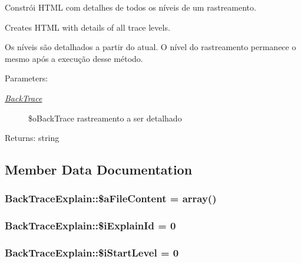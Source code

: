 Constrói HTML com detalhes de todos os níveis de um rastreamento.

Creates HTML with details of all trace levels.

Os níveis são detalhados a partir do atual. O nível do rastreamento permanece o mesmo após a execução desse método.

\begin{Desc}
\item[Parameters:]
\begin{description}
\item[{\em \hyperlink{class_back_trace}{BackTrace}}]\$oBackTrace rastreamento a ser detalhado \end{description}
\end{Desc}
\begin{Desc}
\item[Returns:]string \end{Desc}


\subsection{Member Data Documentation}
\hypertarget{class_back_trace_explain_bc66a959dd0c9dd7fa44b770beeccfbc}{
\subsubsection[{\$aFileContent}]{\setlength{\rightskip}{0pt plus 5cm}BackTraceExplain::\$aFileContent = array()}}
\label{class_back_trace_explain_bc66a959dd0c9dd7fa44b770beeccfbc}


\hypertarget{class_back_trace_explain_a232cb65ebfb6fc0202bf16cf93e04c0}{
\subsubsection[{\$iExplainId}]{\setlength{\rightskip}{0pt plus 5cm}BackTraceExplain::\$iExplainId = 0}}
\label{class_back_trace_explain_a232cb65ebfb6fc0202bf16cf93e04c0}


\hypertarget{class_back_trace_explain_ec3a3d33c1d97e5e13a39d4002dd080b}{
\subsubsection[{\$iStartLevel}]{\setlength{\rightskip}{0pt plus 5cm}BackTraceExplain::\$iStartLevel = 0}}
\label{class_back_trace_explain_ec3a3d33c1d97e5e13a39d4002dd080b}


